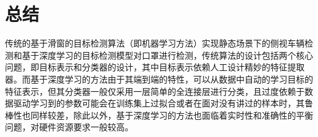 \section{总结}
传统的基于滑窗的目标检测算法（即机器学习方法）实现静态场景下的侧视车辆检测和基于深度学习的目标检测模型对口罩进行检测，传统算法的设计包括两个核心问题，即目标表示和分类器的设计，其中目标表示依赖人工设计精妙的特征提取器。而基于深度学习的方法由于其端到端的特性，可以从数据中自动的学习目标的特征表示，但其分类器一般仅采用一层简单的全连接层进行分类，且过度依赖于数据驱动学习到的参数可能会在训练集上过拟合或者在面对没有讲过的样本时，其鲁棒性也同样较差，除此以外，基于深度学习的方法也面临着实时性和准确性的平衡问题，对硬件资源要求一般较高。